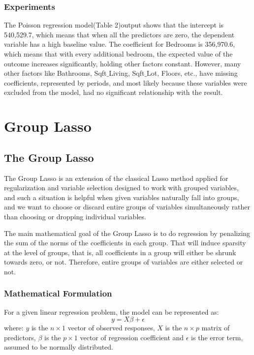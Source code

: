 \documentclass[a4paper, 8pt]{article}
\begin{document}
\begin{multicols}{2}
\subsubsection{Experiments}
The Poisson regression model(Table 2)output shows that the intercept is 540,529.7, which means that when all the predictors are zero, the dependent variable has a high baseline value. The coefficient for Bedrooms is 356,970.6, which means that with every additional bedroom, the expected value of the outcome increases significantly, holding other factors constant. However, many other factors like Bathrooms, Sqft$\_$Living, Sqft$\_$Lot, Floors, etc., have missing coefficients, represented by periods, and most likely because these variables were excluded from the model, had no significant relationship with the result.

\section{Group Lasso}
\subsection{The Group Lasso}
The Group Lasso is an extension of the classical Lasso method applied for regularization and variable selection designed to work with grouped variables, and such a situation is helpful when given variables naturally fall into groups, and we want to choose or discard entire groups of variables simultaneously rather than choosing or dropping individual variables.

The main mathematical goal of the Group Lasso is to do regression by penalizing the sum of the norms of the coefficients in each group. That will induce sparsity at the level of groups, that is, all coefficients in a group will either be shrunk towards zero, or not. Therefore, entire groups of variables are either selected or not.

\subsubsection*{Mathematical Formulation}
For a given linear regression problem, the model can be represented as:
\begin{equation}
y=X\beta + \epsilon
\end{equation}
where: $y$ is the $n \times 1$ vector of observed responses, $X$ is the $n \times p$ matrix of predictors, $\beta$ is the $p \times 1$ vector of regression coefficient and $\epsilon$ is the error term, assumed to be normally distributed.\\


\end{multicols}
\end{document}
